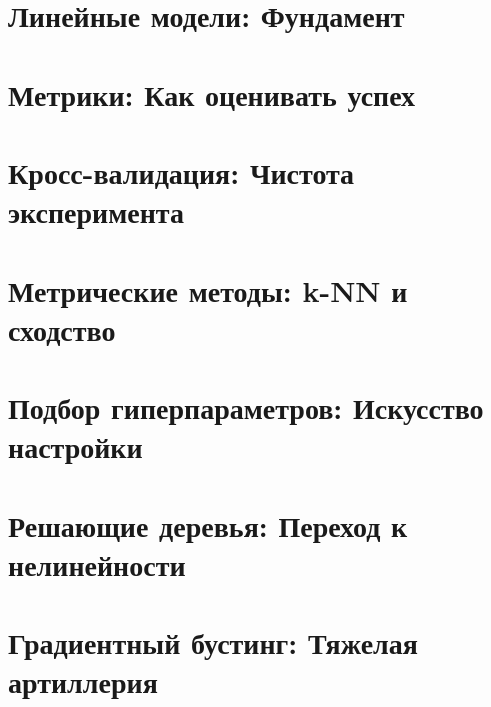 \documentclass[12pt]{article}
\begin{document}

\section{Линейные модели: Фундамент}

\newpage

\section{Метрики: Как оценивать успех}

\newpage

\section{Кросс-валидация: Чистота эксперимента}

\newpage

\section{Метрические методы: k-NN и сходство}

\newpage

\section{Подбор гиперпараметров: Искусство настройки}

\newpage

\section{Решающие деревья: Переход к нелинейности}

\newpage

\section{Градиентный бустинг: Тяжелая артиллерия}

\end{document}
